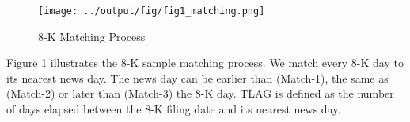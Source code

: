 \begin{figure}
	\caption{8-K Matching Process} \label{fig1}
	\begin{center}
		\texttt{[image: ../output/fig/fig1\_matching.png]}
	\end{center}
\end{figure}

\begin{footnotesize}
	\noindent Figure 1 illustrates the 8-K sample matching process. We match every 8-K day to its nearest news day. The news day can be earlier than (Match-1), the same as (Match-2) or later than (Match-3) the 8-K day. TLAG is defined as the number of days elapsed between the 8-K filing date and its nearest news day.
\end{footnotesize}

%
